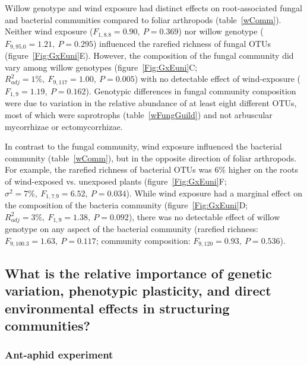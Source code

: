 \documentclass[11pt]{article}
\begin{document}
Willow genotype and wind exposure had distinct effects on
root-associated fungal and bacterial communities compared to foliar
arthropods (table~\ref{wComm}). Neither wind exposure (\(F_{1,8.8}=0.90,\ P=0.369\)) nor
willow genotype (\(F_{9,95.0}=1.21,\ P=0.295\)) influenced the rarefied richness of
fungal OTUs (figure~\ref{Fig:GxEuni}E). However, the composition of the fungal community
did vary among willow genotypes (figure~\ref{Fig:GxEuni}C; \(R_{adj}^2=1\%,\ F_{9,117}=1.00,\ P=0.005\)) with no
detectable effect of wind-exposure (\(F_{1,9}=1.19,\ P=0.162\)). Genotypic
differences in fungal community composition were due to variation in the
relative abundance of at least eight different OTUs, most of which were
saprotrophs (table~\ref{wFungGuild}) and not arbuscular mycorrhizae or ectomycorrhizae.

In contrast to the fungal community, wind exposure influenced the
bacterial community (table~\ref{wComm}), but in the opposite direction of foliar
arthropods. For example, the rarefied richness of bacterial OTUs was 6\%
higher on the roots of wind-exposed vs. unexposed plants (figure~\ref{Fig:GxEuni}F;
\(\sigma^2=7\%,\ F_{1,7.9}=6.52,\ P=0.034\)). While wind exposure had a marginal effect on the
composition of the bacteria community (figure~\ref{Fig:GxEuni}D; \(R_{adj}^2=3\%,\ F_{1,9}=1.38,\ P=0.092\)),
there was no detectable effect of willow genotype on any aspect of the
bacterial community (rarefied richness: \(F_{9,100.3}=1.63,\ P=0.117\); community
composition: \(F_{9,120}=0.93,\ P=0.536\)).

\subsection*{What is the relative importance of genetic
variation, phenotypic plasticity, and direct environmental effects in
structuring
communities?}

\subsubsection*{Ant-aphid experiment}
\end{document}
